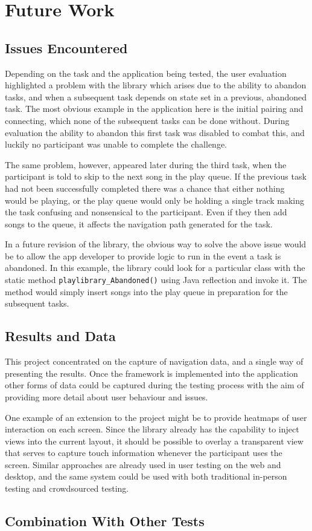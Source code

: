 \section{Future Work}

\subsection{Issues Encountered}

Depending on the task and the application being tested, the user 
evaluation highlighted a problem with the library which arises
due to the ability to abandon tasks, and when a subsequent task
depends on state set in a previous, abandoned task. The most 
obvious example in the application here is the initial pairing
and connecting, which none of the subsequent tasks can be done
without. During evaluation the ability to abandon this first task
was disabled to combat this, and luckily no participant was unable
to complete the challenge.

The same problem, however, appeared later during the third task, when
the participant is told to skip to the next song in the play queue.
If the previous task had not been successfully completed there was a
chance that either nothing would be playing, or the play queue would
only be holding a single track making the task confusing and nonsensical
to the participant. Even if they then add songs to the queue, it affects
the navigation path generated for the task.

In a future revision of the library, the obvious way to solve the above issue
would be to allow the app developer to provide logic to run in the event
a task is abandoned. In this example, the library could look for a
particular class with the static method \verb/playlibrary_Abandoned()/
using Java reflection and invoke it. The method would simply insert
songs into the play queue in preparation for the subsequent tasks.

\subsection{Results and Data}

This project concentrated on the capture of navigation data, and a single
way of presenting the results. Once the framework is implemented into the
application other forms of data could be captured during the testing
process with the aim of providing more detail about user behaviour and
issues.

One example of an extension to the project might be to provide heatmaps
of user interaction on each screen. Since the library already has the
capability to inject views into the current layout, it should be possible
to overlay a transparent view that serves to capture touch information
whenever the participant uses the screen. Similar approaches are already
used in user testing on the web and desktop, and the same system could
be used with both traditional in-person testing and crowdsourced testing.


\subsection{Combination With Other Tests}

